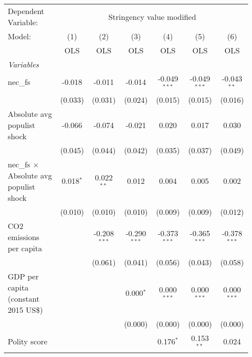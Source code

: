 
\begingroup
\centering
\begin{tabular}{lcccccc}
   \toprule
   Dependent Variable: & \multicolumn{6}{c}{Stringency value modified}\\
   Model:                                         & (1)         & (2)            & (3)            & (4)            & (5)            & (6)\\  
                                                  &  OLS        & OLS            & OLS            & OLS            & OLS            & OLS\\  
   \midrule
   \emph{Variables}\\
   nec\_fs                                        & -0.018      & -0.011         & -0.014         & -0.049$^{***}$ & -0.049$^{***}$ & -0.043$^{**}$\\   
                                                  & (0.033)     & (0.031)        & (0.024)        & (0.015)        & (0.015)        & (0.016)\\   
   Absolute avg populist shock                    & -0.066      & -0.074         & -0.021         & 0.020          & 0.017          & 0.030\\   
                                                  & (0.045)     & (0.044)        & (0.042)        & (0.035)        & (0.037)        & (0.049)\\   
   nec\_fs $\times$ Absolute avg populist shock   & 0.018$^{*}$ & 0.022$^{**}$   & 0.012          & 0.004          & 0.005          & 0.002\\   
                                                  & (0.010)     & (0.010)        & (0.010)        & (0.009)        & (0.009)        & (0.012)\\   
   CO2 emissions per capita                       &             & -0.208$^{***}$ & -0.290$^{***}$ & -0.373$^{***}$ & -0.365$^{***}$ & -0.378$^{***}$\\   
                                                  &             & (0.061)        & (0.041)        & (0.056)        & (0.043)        & (0.058)\\   
   GDP per capita (constant 2015 US\$)            &             &                & 0.000$^{*}$    & 0.000$^{***}$  & 0.000$^{***}$  & 0.000$^{***}$\\   
                                                  &             &                & (0.000)        & (0.000)        & (0.000)        & (0.000)\\   
   Polity score                                   &             &                &                & 0.176$^{*}$    & 0.153$^{**}$   & 0.024\\   

\end{tabular}
